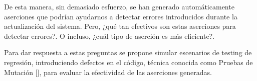 De esta manera, sin demasiado esfuerzo, se han generado automáticamente aserciones que podrían ayudarnos a detectar errores introducidos durante la actualización del sistema. Pero, ¿qué tan efectivos son estas aserciones para detectar errores?. O incluso, ¿cuál tipo de aserción es más eficiente?.

Para dar respuesta a estas preguntas se propone simular escenarios de testing de regresión, introduciendo defectos en el código, técnica conocida como Pruebas de Mutación [], para evaluar la efectividad de las aserciones generadas.